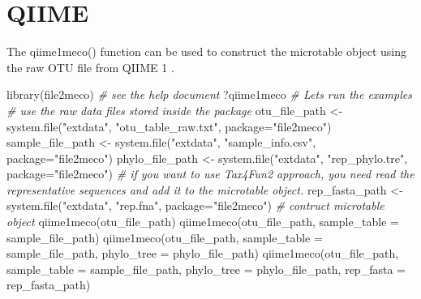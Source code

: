 \documentclass[
]{book}
\newenvironment{Shaded}{\begin{snugshade}}{\end{snugshade}}
\newcommand{\AttributeTok}[1]{\textcolor[rgb]{0.77,0.63,0.00}{#1}}
\newcommand{\CommentTok}[1]{\textcolor[rgb]{0.56,0.35,0.01}{\textit{#1}}}
\newcommand{\FunctionTok}[1]{\textcolor[rgb]{0.00,0.00,0.00}{#1}}
\newcommand{\NormalTok}[1]{#1}
\newcommand{\OtherTok}[1]{\textcolor[rgb]{0.56,0.35,0.01}{#1}}
\newcommand{\StringTok}[1]{\textcolor[rgb]{0.31,0.60,0.02}{#1}}
\begin{document}
\hypertarget{qiime}{%
\section{QIIME}\label{qiime}}

The qiime1meco() function can be used to construct the microtable object using the raw OTU file from QIIME 1 \citep{Caporaso_QIIME_2010}.

\begin{Shaded}
\begin{Highlighting}[]
\FunctionTok{library}\NormalTok{(file2meco)}
\CommentTok{\# see the help document}
\NormalTok{?qiime1meco}
\CommentTok{\# Let\textquotesingle{}s run the examples}
\CommentTok{\# use the raw data files stored inside the package}
\NormalTok{otu\_file\_path }\OtherTok{\textless{}{-}} \FunctionTok{system.file}\NormalTok{(}\StringTok{"extdata"}\NormalTok{, }\StringTok{"otu\_table\_raw.txt"}\NormalTok{, }\AttributeTok{package=}\StringTok{"file2meco"}\NormalTok{)}
\NormalTok{sample\_file\_path }\OtherTok{\textless{}{-}} \FunctionTok{system.file}\NormalTok{(}\StringTok{"extdata"}\NormalTok{, }\StringTok{"sample\_info.csv"}\NormalTok{, }\AttributeTok{package=}\StringTok{"file2meco"}\NormalTok{)}
\NormalTok{phylo\_file\_path }\OtherTok{\textless{}{-}} \FunctionTok{system.file}\NormalTok{(}\StringTok{"extdata"}\NormalTok{, }\StringTok{"rep\_phylo.tre"}\NormalTok{, }\AttributeTok{package=}\StringTok{"file2meco"}\NormalTok{)}
\CommentTok{\# if you want to use Tax4Fun2 approach, you need read the representative sequences and add it to the microtable object.}
\NormalTok{rep\_fasta\_path }\OtherTok{\textless{}{-}} \FunctionTok{system.file}\NormalTok{(}\StringTok{"extdata"}\NormalTok{, }\StringTok{"rep.fna"}\NormalTok{, }\AttributeTok{package=}\StringTok{"file2meco"}\NormalTok{)}
\CommentTok{\# contruct microtable object}
\FunctionTok{qiime1meco}\NormalTok{(otu\_file\_path)}
\FunctionTok{qiime1meco}\NormalTok{(otu\_file\_path, }\AttributeTok{sample\_table =}\NormalTok{ sample\_file\_path)}
\FunctionTok{qiime1meco}\NormalTok{(otu\_file\_path, }\AttributeTok{sample\_table =}\NormalTok{ sample\_file\_path, }\AttributeTok{phylo\_tree =}\NormalTok{ phylo\_file\_path)}
\FunctionTok{qiime1meco}\NormalTok{(otu\_file\_path, }\AttributeTok{sample\_table =}\NormalTok{ sample\_file\_path, }\AttributeTok{phylo\_tree =}\NormalTok{ phylo\_file\_path, }\AttributeTok{rep\_fasta =}\NormalTok{ rep\_fasta\_path)}
\end{Highlighting}
\end{Shaded}
\end{document}
